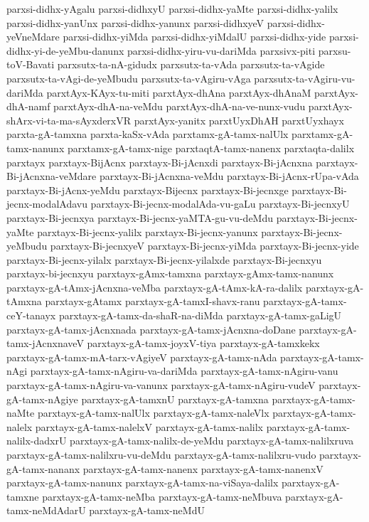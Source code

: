 {parxsi-didhx-yAgalu
parxsi-didhxyU
parxsi-didhx-yaMte
parxsi-didhx-yalilx
parxsi-didhx-yanUnx
parxsi-didhx-yanunx
parxsi-didhxyeV
parxsi-didhx-yeVneMdare
parxsi-didhx-yiMda
parxsi-didhx-yiMdalU
parxsi-didhx-yide
parxsi-didhx-yi-de-yeMbu-danunx
parxsi-didhx-yiru-vu-dariMda
parxsivx-piti
parxsu-toV-Bavati
parxsutx-ta-nA-gidudx
parxsutx-ta-vAda
parxsutx-ta-vAgide
parxsutx-ta-vAgi-de-yeMbudu
parxsutx-ta-vAgiru-vAga
parxsutx-ta-vAgiru-vu-dariMda
parxtAyx-KAyx-tu-miti
parxtAyx-dhAna
parxtAyx-dhAnaM
parxtAyx-dhA-namf
parxtAyx-dhA-na-veMdu
parxtAyx-dhA-na-ve-nunx-vudu
parxtAyx-shArx-vi-ta-ma-sAyxderxVR
parxtAyx-yanitx
parxtUyxDhAH
parxtUyxhayx
parxta-gA-tamxna
parxta-kaSx-vAda
parxtamx-gA-tamx-nalUlx
parxtamx-gA-tamx-nanunx
parxtamx-gA-tamx-nige
parxtaqtA-tamx-nanenx
parxtaqta-dalilx
parxtayx
parxtayx-BijAcnx
parxtayx-Bi-jAcnxdi
parxtayx-Bi-jAcnxna
parxtayx-Bi-jAcnxna-veMdare
parxtayx-Bi-jAcnxna-veMdu
parxtayx-Bi-jAcnx-rUpa-vAda
parxtayx-Bi-jAcnx-yeMdu
parxtayx-Bijecnx
parxtayx-Bi-jecnxge
parxtayx-Bi-jecnx-modalAdavu
parxtayx-Bi-jecnx-modalAda-vu-gaLu
parxtayx-Bi-jecnxyU
parxtayx-Bi-jecnxya
parxtayx-Bi-jecnx-yaMTA-gu-vu-deMdu
parxtayx-Bi-jecnx-yaMte
parxtayx-Bi-jecnx-yalilx
parxtayx-Bi-jecnx-yanunx
parxtayx-Bi-jecnx-yeMbudu
parxtayx-Bi-jecnxyeV
parxtayx-Bi-jecnx-yiMda
parxtayx-Bi-jecnx-yide
parxtayx-Bi-jecnx-yilalx
parxtayx-Bi-jecnx-yilalxde
parxtayx-Bi-jecnxyu
parxtayx-bi-jecnxyu
parxtayx-gAmx-tamxna
parxtayx-gAmx-tamx-nanunx
parxtayx-gA-tAmx-jAcnxna-veMba
parxtayx-gA-tAmx-kA-ra-dalilx
parxtayx-gA-tAmxna
parxtayx-gAtamx
parxtayx-gA-tamxI-shavx-ranu
parxtayx-gA-tamx-ceY-tanayx
parxtayx-gA-tamx-da-shaR-na-diMda
parxtayx-gA-tamx-gaLigU
parxtayx-gA-tamx-jAcnxnada
parxtayx-gA-tamx-jAcnxna-doDane
parxtayx-gA-tamx-jAcnxnaveV
parxtayx-gA-tamx-joyxV-tiya
parxtayx-gA-tamxkekx
parxtayx-gA-tamx-mA-tarx-vAgiyeV
parxtayx-gA-tamx-nAda
parxtayx-gA-tamx-nAgi
parxtayx-gA-tamx-nAgiru-va-dariMda
parxtayx-gA-tamx-nAgiru-vanu
parxtayx-gA-tamx-nAgiru-va-vanunx
parxtayx-gA-tamx-nAgiru-vudeV
parxtayx-gA-tamx-nAgiye
parxtayx-gA-tamxnU
parxtayx-gA-tamxna
parxtayx-gA-tamx-naMte
parxtayx-gA-tamx-nalUlx
parxtayx-gA-tamx-naleVlx
parxtayx-gA-tamx-nalelx
parxtayx-gA-tamx-nalelxV
parxtayx-gA-tamx-nalilx
parxtayx-gA-tamx-nalilx-dadxrU
parxtayx-gA-tamx-nalilx-de-yeMdu
parxtayx-gA-tamx-nalilxruva
parxtayx-gA-tamx-nalilxru-vu-deMdu
parxtayx-gA-tamx-nalilxru-vudo
parxtayx-gA-tamx-nananx
parxtayx-gA-tamx-nanenx
parxtayx-gA-tamx-nanenxV
parxtayx-gA-tamx-nanunx
parxtayx-gA-tamx-na-viSaya-dalilx
parxtayx-gA-tamxne
parxtayx-gA-tamx-neMba
parxtayx-gA-tamx-neMbuva
parxtayx-gA-tamx-neMdAdarU
parxtayx-gA-tamx-neMdU
}
